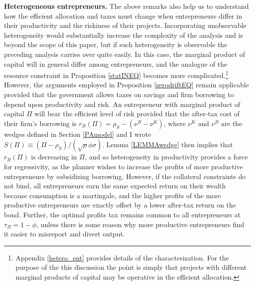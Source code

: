 \documentclass[11pt]{article}
\theoremstyle{plain}
\theoremstyle{definition} %
\begin{document}
\textbf{Heterogeneous entrepreneurs.} The above remarks also help us to understand how the efficient allocation and taxes must change when entrepreneurs differ in their productivity and the riskiness of their projects. Incorporating unobservable heterogeneity would substantially increase the complexity of the analysis and is beyond the scope of this paper, but if such heterogeneity is observable the preceding analysis carries over quite easily. In this case, the marginal product of capital will in general differ among entrepreneurs, and the analogue of the resource constraint in Proposition \ref{statINEQ} becomes more complicated.\footnote{Appendix \ref{hetero_ent} provides details of the characterization. For the purpose of the this discussion the point is simply that projects with different marginal products of capital may be operative in the efficient allocation.} However, the arguments employed in Proposition \ref{zerodriftEQ} remain applicable provided that the government allows taxes on savings and firm borrowing to depend upon productivity and risk. An entrepreneur with marginal product of capital $\Pi$ will bear the efficient level of risk provided that the after-tax cost of their firm's borrowing is $r_B(\Pi) = \rho_S - (\nu^B - \nu^K)$, where $\nu^K$ and $\nu^B$ are the wedges defined in Section \ref{PAmodel} and I wrote $S(\Pi) \equiv (\Pi - \rho_S)/(\sqrt{\rho}\phi\sigma)$. Lemma \ref{LEMMAwedge} then implies that $r_B(\Pi)$ is decreasing in $\Pi$, and so heterogeneity in productivity provides a force for regressivity, as the planner wishes to increase the profits of more productive entrepreneurs by subsidizing borrowing. However, if the collateral constraints do not bind, all entrepreneurs earn the same expected return on their wealth because consumption is a martingale, and the higher profits of the more productive entrepreneurs are exactly offset by a lower after-tax return on the bond. Further, the optimal profits tax remains common to all entrepreneurs at $\tau_{\Pi} = 1 - \phi$, unless there is some reason why more productive entrepreneurs find it easier to misreport and divert output.
\end{document}
